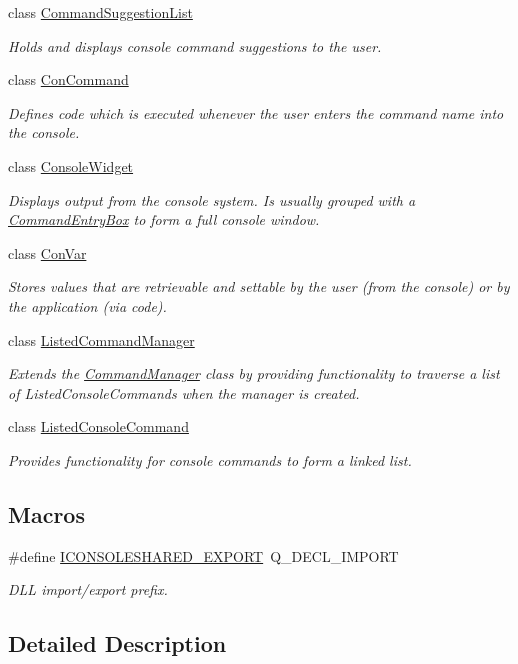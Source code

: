 \begin{DoxyCompactItemize}
class \hyperlink{class_command_suggestion_list}{Command\-Suggestion\-List}
\begin{DoxyCompactList}\small\item\em Holds and displays console command suggestions to the user. \end{DoxyCompactList}\item 
class \hyperlink{class_con_command}{Con\-Command}
\begin{DoxyCompactList}\small\item\em Defines code which is executed whenever the user enters the command name into the console. \end{DoxyCompactList}\item 
class \hyperlink{class_console_widget}{Console\-Widget}
\begin{DoxyCompactList}\small\item\em Displays output from the console system. Is usually grouped with a \hyperlink{class_command_entry_box}{Command\-Entry\-Box} to form a full console window. \end{DoxyCompactList}\item 
class \hyperlink{class_con_var}{Con\-Var}
\begin{DoxyCompactList}\small\item\em Stores values that are retrievable and settable by the user (from the console) or by the application (via code). \end{DoxyCompactList}\item 
class \hyperlink{class_listed_command_manager}{Listed\-Command\-Manager}
\begin{DoxyCompactList}\small\item\em Extends the \hyperlink{class_command_manager}{Command\-Manager} class by providing functionality to traverse a list of Listed\-Console\-Commands when the manager is created. \end{DoxyCompactList}\item 
class \hyperlink{class_listed_console_command}{Listed\-Console\-Command}
\begin{DoxyCompactList}\small\item\em Provides functionality for console commands to form a linked list. \end{DoxyCompactList}\end{DoxyCompactItemize}
\subsection*{Macros}
\begin{DoxyCompactItemize}
\item 
\hypertarget{group___i_console_ga90bbfa5cf7aee8afd56acdcce53c4a08}{\#define \hyperlink{group___i_console_ga90bbfa5cf7aee8afd56acdcce53c4a08}{I\-C\-O\-N\-S\-O\-L\-E\-S\-H\-A\-R\-E\-D\-\_\-\-E\-X\-P\-O\-R\-T}~Q\-\_\-\-D\-E\-C\-L\-\_\-\-I\-M\-P\-O\-R\-T}\label{group___i_console_ga90bbfa5cf7aee8afd56acdcce53c4a08}

\begin{DoxyCompactList}\small\item\em D\-L\-L import/export prefix. \end{DoxyCompactList}\end{DoxyCompactItemize}


\subsection{Detailed Description}
